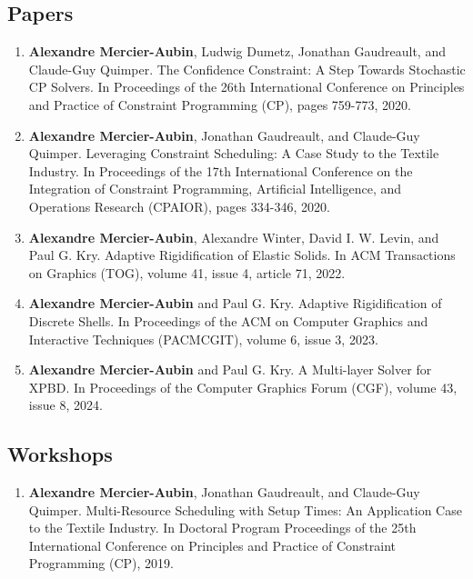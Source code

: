 \documentclass[10pt]{article} %
\begin{document}
\subsection{Papers}
%
%
\begin{enumerate}
  \setcounter{enumi}{\value{listCounter}}
  \item \textbf{Alexandre Mercier-Aubin}, Ludwig Dumetz, Jonathan Gaudreault, and Claude-Guy Quimper. The Confidence Constraint: A Step Towards Stochastic CP Solvers. In Proceedings of the 26th International Conference on Principles and Practice of Constraint Programming (CP), pages 759-773, 2020. 

 \item \textbf{Alexandre Mercier-Aubin}, Jonathan Gaudreault, and Claude-Guy Quimper. Leveraging Constraint Scheduling: A Case Study to the Textile Industry. In Proceedings of the 17th International Conference on the Integration of Constraint Programming, Artificial Intelligence, and Operations Research (CPAIOR), pages 334-346, 2020. 

 \item \textbf{Alexandre Mercier-Aubin},  Alexandre Winter,  David I. W. Levin, and Paul G. Kry. Adaptive Rigidification of Elastic Solids. In ACM Transactions on Graphics (TOG), volume 41, issue 4, article 71, 2022.  

 \item \textbf{Alexandre Mercier-Aubin} and Paul G. Kry. Adaptive Rigidification of Discrete Shells. In Proceedings of the ACM on Computer Graphics and Interactive Techniques (PACMCGIT), volume 6, issue 3, 2023. 

\item \textbf{Alexandre Mercier-Aubin} and Paul G. Kry. A Multi-layer Solver for XPBD. In Proceedings of the Computer Graphics Forum (CGF), volume 43, issue 8, 2024. 
\end{enumerate}

\subsection{Workshops}
\begin{enumerate}
  \setcounter{enumi}{\value{listCounter}}
  \item \textbf{Alexandre Mercier-Aubin}, Jonathan Gaudreault, and Claude-Guy Quimper. Multi-Resource Scheduling with Setup Times:
An Application Case to the Textile Industry. In Doctoral Program Proceedings of the 25th International
Conference on Principles and Practice of Constraint Programming (CP), 2019. 

\end{enumerate}
\end{document}
